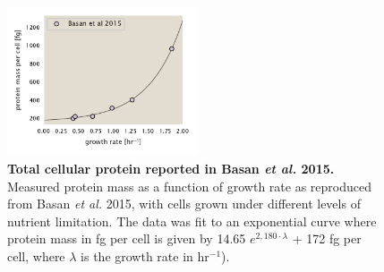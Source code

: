 \begin{figure}
		\centering
    \includegraphics[width=0.5\textwidth]{SI_figs/figA8_schmidt_protein_estimate_basan.pdf}
  \caption{{\bf Total cellular protein reported in Basan \textit{et al.} 2015.}
  Measured protein mass as a function of growth rate as reproduced from Basan
  \textit{et al.} 2015, with cells grown under different levels of nutrient
  limitation. The data was fit to an exponential curve  where protein mass in fg
  per cell is given by 14.65 $e^{2,180 \cdot \lambda}$ + 172 fg per cell, where
  $\lambda$ is the growth rate in hr$^{-1}$).}
  \label{fig:schmidt_adjustment_basan}
\end{figure}
